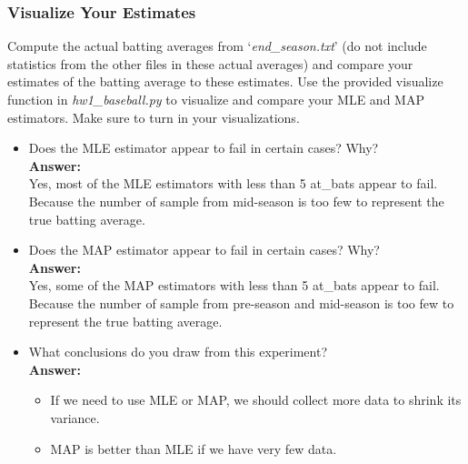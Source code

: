 \documentclass{article}
\begin{document}
\subsubsection*{Visualize Your Estimates}

Compute the actual batting averages from `\textit{end\_season.txt}' (do not include statistics from the other files in these actual averages) and compare your estimates of the batting average to these estimates. Use the provided visualize function in \textit{hw1\_baseball.py} to visualize and compare your MLE and MAP estimators. Make sure to turn in your visualizations.


\begin{itemize}
	\item Does the MLE estimator appear to fail in certain cases? Why?
	\\\textbf{Answer:}\\
	Yes, most of the MLE estimators with less than 5 at\_bats appear to fail. Because the number of sample from mid-season is too few to represent the true batting average.
	
	\item Does the MAP estimator appear to fail in certain cases? Why?
	\\\textbf{Answer:}\\
	Yes, some of the MAP estimators with less than 5 at\_bats appear to fail. Because the number of sample from pre-season and mid-season is too few to represent the true batting average.
	
	\item What conclusions do you draw from this experiment?
	\\\textbf{Answer:}\\
	\begin{itemize}
		\item If we need to use MLE or MAP, we should collect more data to shrink its variance.
		\item MAP is better than MLE if we have very few data.
	\end{itemize}
\end{itemize}
\end{document}
